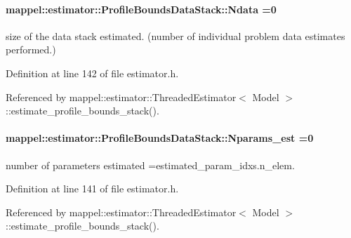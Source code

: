 \paragraph[{\texorpdfstring{Ndata}{Ndata}}]{ mappel\+::estimator\+::\+Profile\+Bounds\+Data\+Stack\+::\+Ndata =0}\hypertarget{structmappel_1_1estimator_1_1ProfileBoundsDataStack_ad3883bc3355fbde3dd47eb3dac23785e}{}\label{structmappel_1_1estimator_1_1ProfileBoundsDataStack_ad3883bc3355fbde3dd47eb3dac23785e}


size of the data stack estimated. (number of individual problem data estimates performed.) 



Definition at line 142 of file estimator.\+h.



Referenced by mappel\+::estimator\+::\+Threaded\+Estimator$<$ Model $>$\+::estimate\+\_\+profile\+\_\+bounds\+\_\+stack().

\paragraph[{\texorpdfstring{Nparams\+\_\+est}{Nparams_est}}]{ mappel\+::estimator\+::\+Profile\+Bounds\+Data\+Stack\+::\+Nparams\+\_\+est =0}\hypertarget{structmappel_1_1estimator_1_1ProfileBoundsDataStack_ae99f72e8d82cabed72b22fd6200c7322}{}\label{structmappel_1_1estimator_1_1ProfileBoundsDataStack_ae99f72e8d82cabed72b22fd6200c7322}


number of parameters estimated =estimated\+\_\+param\+\_\+idxs.\+n\+\_\+elem. 



Definition at line 141 of file estimator.\+h.



Referenced by mappel\+::estimator\+::\+Threaded\+Estimator$<$ Model $>$\+::estimate\+\_\+profile\+\_\+bounds\+\_\+stack().

